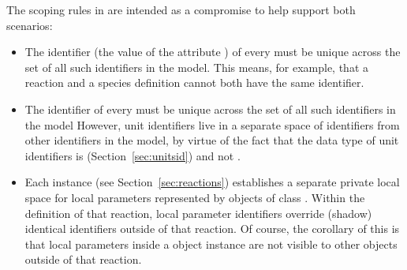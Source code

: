 The scoping rules in \sbmlthree are intended as a compromise to help
support both scenarios:
\begin{itemize}
  
\item The identifier (\ie the value of the attribute ) of
  every 
  must be unique across the set of all such identifiers in
  the model.  This means, for example, that a reaction and a
  species definition cannot both have the same identifier.

\item The identifier of every \UnitDefinition must be unique
  across the set of all such identifiers in the model   However,
  unit identifiers live in a separate space of identifiers from
  other identifiers in the model, by virtue of the fact that the
  data type of unit identifiers is 
  (Section~\ref{sec:unitsid}) and not .
  
\item Each \Reaction instance (see Section~\ref{sec:reactions})
  establishes a separate private local space for local parameters
  represented by objects of class \LocalParameter.  Within the
  definition of that reaction, local parameter identifiers
  override (shadow) identical identifiers 
  outside of that reaction.  Of course, the corollary of this is
  that local parameters inside a \Reaction object instance are not
  visible to other objects outside of that reaction. 


\end{itemize}


